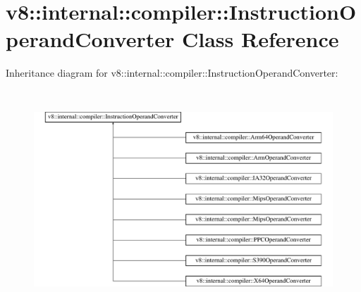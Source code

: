 \hypertarget{classv8_1_1internal_1_1compiler_1_1InstructionOperandConverter}{}\section{v8\+:\+:internal\+:\+:compiler\+:\+:Instruction\+Operand\+Converter Class Reference}
\label{classv8_1_1internal_1_1compiler_1_1InstructionOperandConverter}
Inheritance diagram for v8\+:\+:internal\+:\+:compiler\+:\+:Instruction\+Operand\+Converter\+:\begin{figure}[H]
\begin{center}
\leavevmode
\includegraphics[height=8.208468cm]{classv8_1_1internal_1_1compiler_1_1InstructionOperandConverter}
\end{center}
\end{figure}
